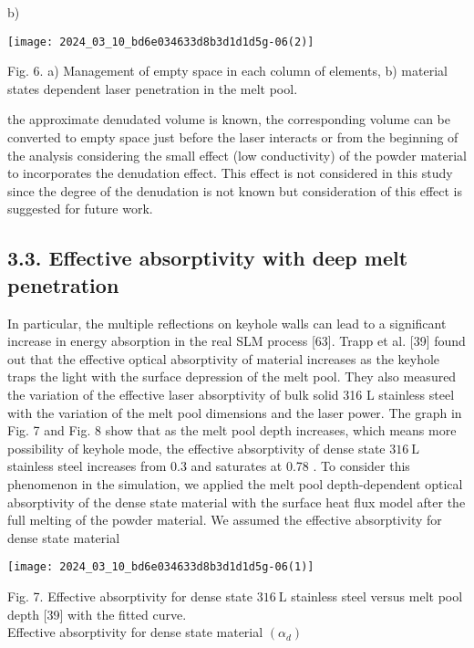 \documentclass[10pt]{article}
\begin{document}
b)

\begin{center}
\texttt{[image: 2024\_03\_10\_bd6e034633d8b3d1d1d5g-06(2)]}
\end{center}

Fig. 6. a) Management of empty space in each column of elements, b) material states dependent laser penetration in the melt pool.

the approximate denudated volume is known, the corresponding volume can be converted to empty space just before the laser interacts or from the beginning of the analysis considering the small effect (low conductivity) of the powder material to incorporates the denudation effect. This effect is not considered in this study since the degree of the denudation is not known but consideration of this effect is suggested for future work.

\subsection*{3.3. Effective absorptivity with deep melt penetration}
In particular, the multiple reflections on keyhole walls can lead to a significant increase in energy absorption in the real SLM process [63]. Trapp et al. [39] found out that the effective optical absorptivity of material increases as the keyhole traps the light with the surface depression of the melt pool. They also measured the variation of the effective laser absorptivity of bulk solid 316 L stainless steel with the variation of the melt pool dimensions and the laser power. The graph in Fig. 7 and Fig. 8 show that as the melt pool depth increases, which means more possibility of keyhole mode, the effective absorptivity of dense state $316 \mathrm{~L}$ stainless steel increases from 0.3 and saturates at 0.78 . To consider this phenomenon in the simulation, we applied the melt pool depth-dependent optical absorptivity of the dense state material with the surface heat flux model after the full melting of the powder material. We assumed the effective absorptivity for dense state material

\begin{center}
\texttt{[image: 2024\_03\_10\_bd6e034633d8b3d1d1d5g-06(1)]}
\end{center}

Fig. 7. Effective absorptivity for dense state $316 \mathrm{~L}$ stainless steel versus melt pool depth [39] with the fitted curve.\\
Effective absorptivity for dense state material $\left(\alpha_{d}\right)$
\end{document}
